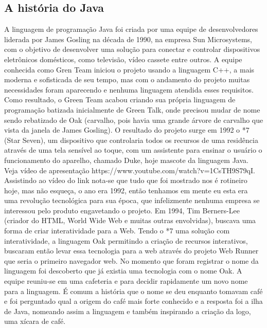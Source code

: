 \documentclass{article}
\begin{document}
\subsection{A história do Java}
\justify
A linguagem de programação Java foi criada por uma equipe de desenvolvedores liderada por James Gosling na década de 1990, na empresa Sun Microsystems, com o objetivo de desenvolver uma solução para conectar e controlar dispositivos eletrônicos domésticos, como televisão, vídeo cassete entre outros. A equipe conhecida como Gren Team iniciou o projeto usando a linguagem C++, a mais moderna e sofisticada de seu tempo, mas com o andamento do projeto muitas necessidades foram aparecendo e nenhuma linguagem atendida esses requisitos. Como resultado, o Green Team acabou criando sua própria linguagem de programação batizada inicialmente de Green Talk, onde precisou mudar de nome sendo rebatizado de Oak (carvalho, pois havia uma grande árvore de carvalho que vista da janela de James Gosling). \newline
O resultado do projeto surge em 1992 o *7 (Star Seven), um dispositivo que controlaria todos os recursos de uma residência através de uma tela sensível ao toque, com um assistente para ensinar o usuário o funcionamento do aparelho, chamado Duke, hoje mascote da linguagem Java. Veja vídeo de apresentação https://www.youtube.com/watch?v=1CsTH9S79qI. Assistindo ao vídeo do link nota-se que tudo que foi mostrado nos é rotineiro hoje, mas não esqueça, o ano era 1992, então tenhamos em mente eu esta era uma revolução tecnológica para sua época, que infelizmente nenhuma empresa se interessou pelo produto engavetando o projeto. \newline
Em 1994, Tim Berners-Lee (criador do HTML, World Wide Web e muitas outras envolvidas), buscava uma forma de criar interatividade para a Web. Tendo o *7 uma solução com interatividade, a linguagem Oak permitindo a criação de recursos interativos, buscaram então levar essa tecnologia para a web através do projeto Web Runner que seria o primeiro navegador web. \newline
No momento que foram registrar o nome da linguagem foi descoberto que já existia uma tecnologia com o nome Oak. A equipe reuniu-se em uma cafeteria e para decidir rapidamente um novo nome para a linguagem. É comum a história que o nome se deu enquanto tomavam café e foi perguntado qual a origem do café mais forte conhecido e a resposta foi a ilha de Java, nomeando assim a linguagem e também inspirando a criação da logo, uma xícara de café. \newline
\end{document}
